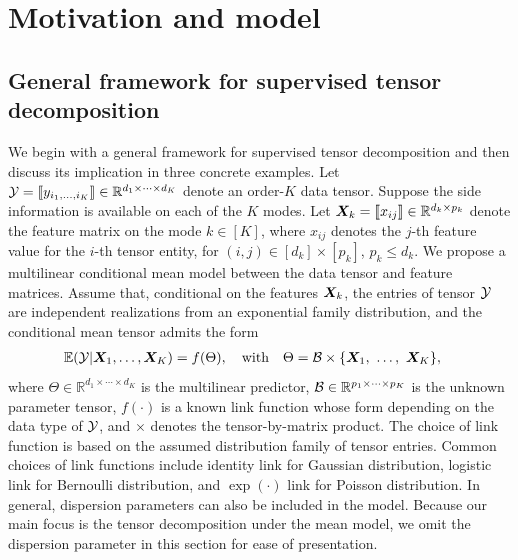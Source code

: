 \documentclass[12pt]{article}
\theoremstyle{plain}
\theoremstyle{definition}
\begin{document}
\section{Motivation and model}\label{sec:model}
\subsection{General framework for supervised tensor decomposition}
We begin with a general framework for supervised tensor decomposition and then discuss its implication in three concrete examples. Let $\mathcal{Y}=\llbracket y_{i_1,\ldots,i_K} \rrbracket\in\mathbb{R}^{d_1\times \cdots\times d_K}$ denote an order-$K$ data tensor. Suppose the side information is available on each of the $K$ modes. Let $\bm X_k=\llbracket x_{ij} \rrbracket\in\mathbb{R}^{d_k\times p_k}$ denote the feature matrix on the mode $k\in[K]$, where $x_{ij}$ denotes the $j$-th feature value for the $i$-th tensor entity, for $(i,j)\in[d_k]\times[p_k]$, $p_k\leq d_k$. We propose a multilinear conditional mean model between the data tensor and feature matrices. Assume that, conditional on the features $\bm X_k$, the entries of tensor $\mathcal{Y}$ are independent realizations from an exponential family distribution, and the conditional mean tensor admits the form
\begin{align}\label{eq:tensormodel}
&\mathbb{E}(\mathcal{Y}|\bm X_1,\ldots,\bm X_K)=f(\Theta),\quad \text{with}\quad \Theta =\mathcal{B}\times\{\bm X_1,\ \ldots,\ \bm X_K\} ,
\end{align}
where $\Theta\in\mathbb{R}^{d_1\times \cdots\times d_K}$ is the multilinear predictor, $\mathcal{B}\in\mathbb{R}^{p_1\times \cdots \times p_K}$ is the unknown parameter tensor, $f(\cdot)$ is a known link function whose form depending on the data type of $\mathcal{Y}$, and $\times$ denotes the tensor-by-matrix product. The choice of link function is based on the assumed distribution family of tensor entries. Common choices of link functions include identity link for Gaussian distribution, logistic link for Bernoulli distribution, and $\exp(\cdot)$ link for Poisson distribution. In general, dispersion parameters can also be included in the model. Because our main focus is the tensor decomposition under the mean model, we omit the dispersion parameter in this section for ease of presentation. 
\end{document}
